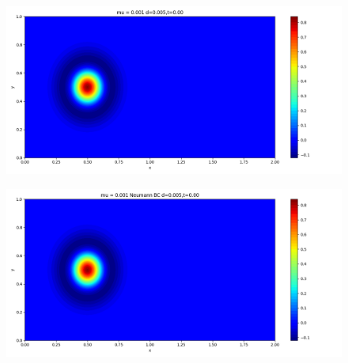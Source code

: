 \documentclass[12pt]{article}
\begin{document}
\begin{figure}[H]
    \centering
    \begin{minipage}{\linewidth}
    \centering
    \begin{minipage}{0.5\textwidth}
    \includegraphics[width=\linewidth]{figuresmu/mu3d0.005t0.00.png}
    \label{fig1}
    \end{minipage}\hfill
    \begin{minipage}{0.5\textwidth}
    \includegraphics[width=\linewidth]{figuresmu/mu3Nud0.005t0.00.png}
    \label{fig2}
    \end{minipage}
    \vspace{-1.5em}
    

\end{minipage}
\end{figure}
\end{document}
